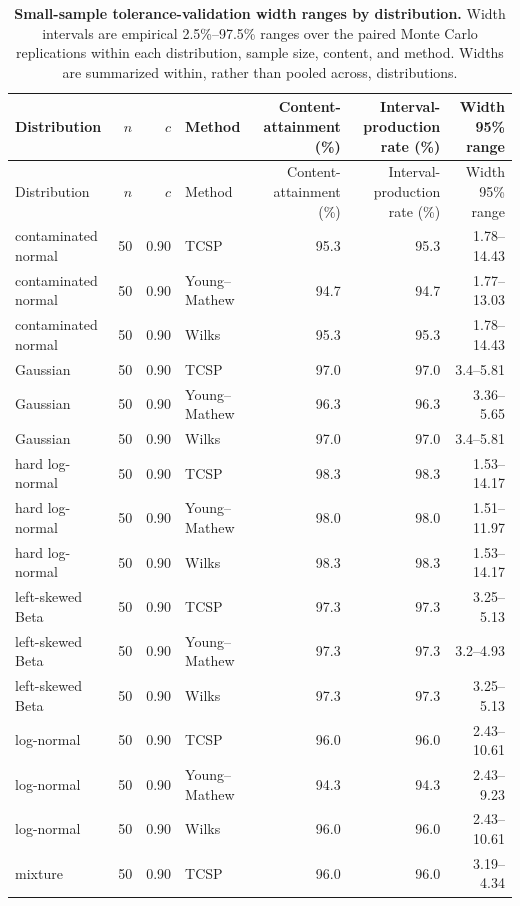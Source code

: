 \begingroup
\scriptsize
\begin{longtable}{@{}p{}rrp{}rrr@{}}
\caption{\textbf{Small-sample tolerance-validation width ranges by distribution.} Width intervals are empirical 2.5\%--97.5\% ranges over the paired Monte Carlo replications within each distribution, sample size, content, and method. Widths are summarized within, rather than pooled across, distributions.}\label{tab:supp-small-sample-dgp-width-ranges}\\
\toprule
Distribution & \(n\) & \(c\) & Method & Content-attainment (\%) & Interval-production rate (\%) & Width 95\% range\\
\midrule
\endfirsthead
\toprule
Distribution & \(n\) & \(c\) & Method & Content-attainment (\%) & Interval-production rate (\%) & Width 95\% range\\
\midrule
\endhead
contaminated normal & 50 & 0.90 & TCSP & 95.3 & 95.3 & 1.78--14.43 \\
contaminated normal & 50 & 0.90 & Young--Mathew & 94.7 & 94.7 & 1.77--13.03 \\
contaminated normal & 50 & 0.90 & Wilks & 95.3 & 95.3 & 1.78--14.43 \\
Gaussian & 50 & 0.90 & TCSP & 97.0 & 97.0 & 3.4--5.81 \\
Gaussian & 50 & 0.90 & Young--Mathew & 96.3 & 96.3 & 3.36--5.65 \\
Gaussian & 50 & 0.90 & Wilks & 97.0 & 97.0 & 3.4--5.81 \\
hard log-normal & 50 & 0.90 & TCSP & 98.3 & 98.3 & 1.53--14.17 \\
hard log-normal & 50 & 0.90 & Young--Mathew & 98.0 & 98.0 & 1.51--11.97 \\
hard log-normal & 50 & 0.90 & Wilks & 98.3 & 98.3 & 1.53--14.17 \\
left-skewed Beta & 50 & 0.90 & TCSP & 97.3 & 97.3 & 3.25--5.13 \\
left-skewed Beta & 50 & 0.90 & Young--Mathew & 97.3 & 97.3 & 3.2--4.93 \\
left-skewed Beta & 50 & 0.90 & Wilks & 97.3 & 97.3 & 3.25--5.13 \\
log-normal & 50 & 0.90 & TCSP & 96.0 & 96.0 & 2.43--10.61 \\
log-normal & 50 & 0.90 & Young--Mathew & 94.3 & 94.3 & 2.43--9.23 \\
log-normal & 50 & 0.90 & Wilks & 96.0 & 96.0 & 2.43--10.61 \\
mixture & 50 & 0.90 & TCSP & 96.0 & 96.0 & 3.19--4.34 \\

\end{longtable}
